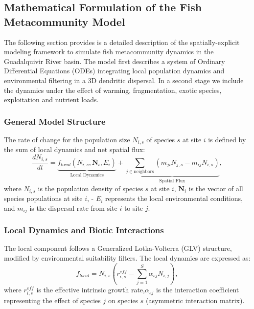 \documentclass[11pt,a4paper]{article}
\begin{document}
\subsection{Mathematical Formulation of the Fish Metacommunity Model}\label{mathematical-formulation-of-the-fish-metacommunity-model}
The following section provides is a detailed description of the spatially-explicit modeling framework to simulate fish metacommunity dynamics in the Guadalquivir River basin. The model first describes a system of
Ordinary Differential Equations (ODEs) integrating local population
dynamics and environmental filtering in a 3D dendritic dispersal. In a second stage we include the dynamics under the effect of warming, fragmentation, exotic species, exploitation and nutrient loads. 

\subsubsection{General Model Structure}\label{general-model-structure}
The rate of change for the population size \(N_{i,s}\) of species \(s\)
at site \(i\) is defined by the sum of local dynamics and net spatial
flux:
\begin{equation}
\frac{dN_{i,s}}{dt} = \underbrace{f_{local}(N_{i,s}, \mathbf{N}_i, E_i)}_{\text{Local Dynamics}} + \underbrace{\sum_{j \in \text{neighbors}} (m_{ji} N_{j,s} - m_{ij} N_{i,s})}_{\text{Spatial Flux}},
\end{equation}
where \(N_{i,s}\) is the population density of species \(s\) at site
\(i\), \(\mathbf{N}_i\) is the vector of all species populations at
site \(i\), - \(E_i\) represents the local environmental conditions, and
\(m_{ij}\) is the dispersal rate from site \(i\) to site \(j\).

\subsubsection{Local Dynamics and Biotic Interactions}\label{local-dynamics-and-environmental-filtering}
The local component follows a Generalized Lotka-Volterra (GLV)
structure, modified by environmental suitability filters. The local dynamics are expressed as:
\begin{equation}
f_{local} = N_{i,s} \left( r_{i,s}^{eff} - \sum_{j=1}^{S} \alpha_{sj} N_{i,j} \right),
\end{equation}
where \(r_{i,s}^{eff}\) is the effective intrinsic growth rate,\(\alpha_{sj}\) is the interaction coefficient representing the effect
of species \(j\) on species \(s\) (asymmetric interaction matrix).
\end{document}
